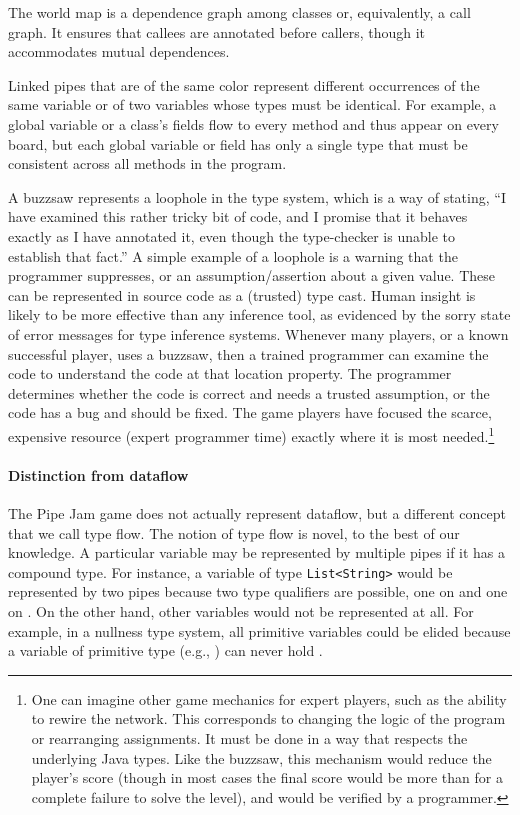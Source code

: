 \documentclass{sig-alternate}
\def\<#1>{\codeid{#1}}
\newcommand{\codeid}[1]{\ifmmode{\mbox{\ttfamily{#1}}}\else{\ttfamily #1}\fi}
\begin{document}
The world map is a dependence graph among classes or, equivalently, a
call graph.  It ensures that callees are annotated before callers,
though it accommodates mutual dependences.

Linked pipes that are of the same color represent different
occurrences of the same variable or of two variables whose types must
be identical.  For example, a global variable or a class's fields flow
to every method and thus appear on every board, but each global
variable or field has only a single type that must be consistent
across all methods in the program.

A buzzsaw represents a loophole in the type system, which is a way of
stating, ``I have examined this rather tricky bit of code, and I
promise that it behaves exactly as I have annotated it, even though
the type-checker is unable to establish that fact.''  A simple example
of a loophole is a warning that the programmer suppresses, or an
assumption/assertion about a given value.  These can be represented in
source code as a (trusted) type cast.  Human insight is likely to be
more effective than any inference tool, as evidenced by the sorry
state of error messages for type inference systems.  Whenever many
players, or a known successful player, uses a buzzsaw, then a trained
programmer can examine the code to understand the code at that
location property.  The programmer determines whether the code is
correct and needs a trusted assumption, or the code has a bug and
should be fixed.  The game players have focused the scarce, expensive
resource (expert programmer time) exactly where it is most
needed.\footnote{One can imagine other game mechanics for expert
  players, such as the ability to rewire the network.  This
  corresponds to changing the logic of the program or rearranging
  assignments.  It must be done in a way that respects the underlying
  Java types.  Like the buzzsaw, this mechanism would reduce the
  player's score (though in most cases the final score would be more
  than for a complete failure to solve the level), and would be
  verified by a programmer.}


\paragraph{Distinction from dataflow}
The Pipe Jam game does not actually represent dataflow, but a
different concept that we call type flow.  The notion of type flow is
novel, to the best of our knowledge.  A particular variable may be
represented by multiple pipes if it has a compound type.  For
instance, a variable of type \verb|List<String>| would be represented
by two pipes because two type qualifiers are possible, one on \<List>
and one on \<String>.  On the other hand, other variables would not be
represented at all.  For example, in a nullness type system, all
primitive variables could be elided because a variable of primitive
type (e.g., \<int>) can never hold \<null>.
\end{document}
